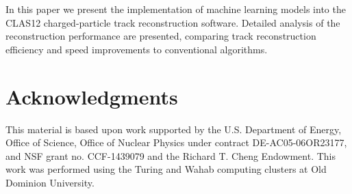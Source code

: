 \documentclass[aps,prl,preprint,12pt]{revtex4}
\begin{document}
In this paper we present the implementation of machine learning models into the CLAS12 charged-particle track 
reconstruction software. Detailed analysis of the reconstruction performance are presented, comparing track 
reconstruction efficiency and speed improvements to conventional algorithms.









\section{Acknowledgments}

This material is based upon work supported by the U.S. Department of Energy, Office of Science, Office of Nuclear 
Physics under contract DE-AC05-06OR23177, and NSF grant no. CCF-1439079 and the Richard T. Cheng Endowment. 
This  work  was  performed  using  the  Turing  and  Wahab computing clusters at Old Dominion University.
 
\newpage


\end{document}
